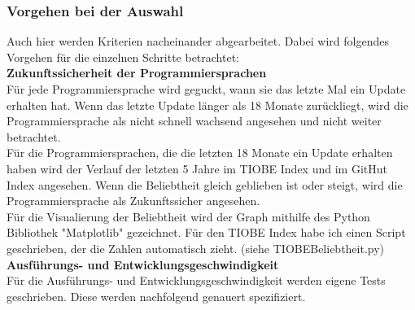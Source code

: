 \documentclass[ngerman]{article}
\begin{document}
    \subsubsection{Vorgehen bei der Auswahl}
    Auch hier werden Kriterien nacheinander abgearbeitet. Dabei wird folgendes Vorgehen für die einzelnen Schritte betrachtet:\\
    \textbf{Zukunftssicherheit der Programmiersprachen}\\
    Für jede Programmiersprache wird geguckt, wann sie das letzte Mal ein Update erhalten hat. Wenn das letzte Update länger als 18 Monate zurückliegt, wird die Programmiersprache als nicht schnell wachsend angesehen und nicht weiter betrachtet.\\
    Für die Programmiersprachen, die die letzten 18 Monate ein Update erhalten haben wird der Verlauf der letzten 5 Jahre im TIOBE Index und im GitHut Index angesehen. Wenn die Beliebtheit gleich geblieben ist oder steigt, wird die Programmiersprache als Zukunftssicher angesehen.\\
    Für die Visualierung der Beliebtheit wird der Graph mithilfe des Python Bibliothek "Matplotlib" gezeichnet. Für den TIOBE Index habe ich einen Script geschrieben, der die Zahlen automatisch zieht. (siehe TIOBEBeliebtheit.py)\\
    \textbf{Ausführungs- und Entwicklungsgeschwindigkeit}\\
    Für die Ausführungs- und Entwicklungsgeschwindigkeit werden eigene Tests geschrieben. Diese werden nachfolgend genauert spezifiziert.\\
\end{document}
